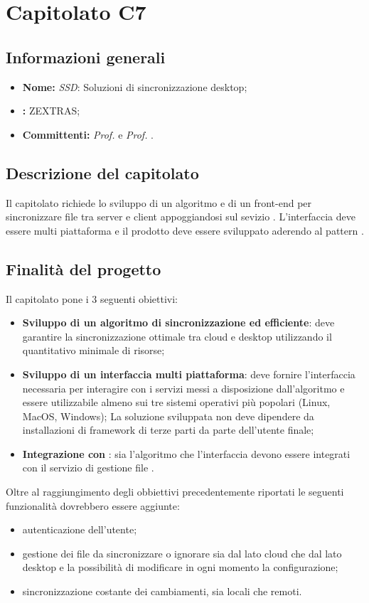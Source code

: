 \section{Capitolato C7}

\subsection{Informazioni generali}
\begin{itemize}
\item \textbf{Nome:} \textit{SSD}: Soluzioni di sincronizzazione desktop;
\item \textbf{:} ZEXTRAS;
\item \textbf{Committenti:} \textit{Prof. \Tullio{}} e \textit{Prof. \Riccardo{}}.
\end{itemize}

\subsection{Descrizione del capitolato}
Il capitolato richiede lo sviluppo di un algoritmo e di un front-end per sincronizzare file tra server e client appoggiandosi sul sevizio .
L'interfaccia deve essere multi piattaforma e il prodotto deve essere sviluppato aderendo al pattern .

\subsection{Finalità del progetto}
Il capitolato pone i 3 seguenti obiettivi:
\begin{itemize}
\item \textbf{Sviluppo di un algoritmo di sincronizzazione  ed efficiente}: deve garantire la sincronizzazione ottimale tra cloud e desktop utilizzando il quantitativo minimale di risorse;
\item \textbf{Sviluppo di un interfaccia multi piattaforma}: deve fornire l'interfaccia necessaria per interagire con i servizi messi a disposizione 
dall'algoritmo e essere utilizzabile almeno sui tre sistemi operativi più popolari (Linux, MacOS, Windows);
La soluzione sviluppata non deve dipendere da installazioni di framework di terze parti da parte dell'utente finale;
\item \textbf{Integrazione con }: sia l'algoritmo che l'interfaccia devono essere integrati con il servizio di gestione file .
\end{itemize}
Oltre al raggiungimento degli obbiettivi precedentemente riportati le seguenti funzionalità dovrebbero essere aggiunte:
\begin{itemize}
\item autenticazione dell'utente;
\item gestione dei file da sincronizzare o ignorare sia dal lato cloud che dal lato desktop e la possibilità di modificare in ogni momento la configurazione;
\item sincronizzazione costante dei cambiamenti, sia locali che remoti.
\end{itemize}

